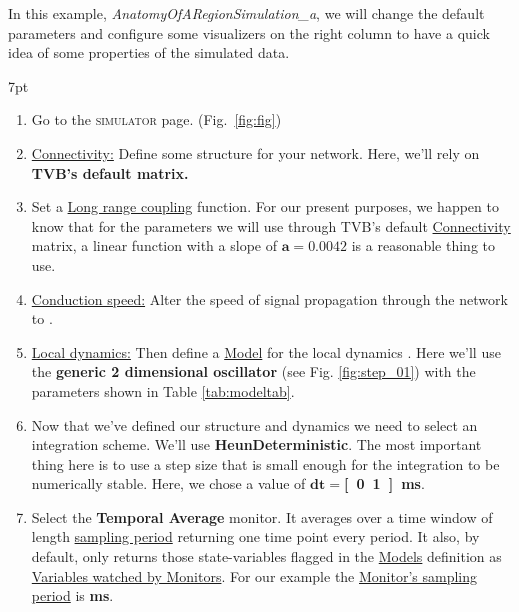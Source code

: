 \documentclass{tufte-handout}
\newenvironment{simulation}{%
  \def\FrameCommand{%
    \hspace{1pt}%
    {\color{ForestGreen}\vrule width 2pt}%
    {\color{simulationshade}\vrule width 4pt}%
    \colorbox{simulationshade}%
  }%
  \MakeFramed{\advance\hsize-\width\FrameRestore}%
  \noindent\hspace{-4.55pt}%
  \begin{adjustwidth}{}{7pt}%
  \vspace{2pt}\vspace{2pt}%
}
{%
  \vspace{2pt}\end{adjustwidth}\endMakeFramed%
}
\begin{document}
In this example, \textit{AnatomyOfARegionSimulation\_a}, we will change the default parameters and configure some
visualizers on the right column to have a quick idea of some properties of the
simulated data.
\begin{simulation}
\begin{enumerate}
\item Go to the \textsc{simulator} page. (Fig.~\ref{fig:fig})

\item \underline{Connectivity:} Define some structure for your network. Here, we'll rely on \textbf{TVB's default  matrix.} 

\item Set a \underline{Long range coupling} function. For our present purposes, we happen to know that for the parameters we will use through TVB's default \underline{Connectivity} matrix, a linear function with a slope of $\mathbf{a=0.0042}$ is a reasonable thing to use. 

\item \underline{Conduction speed:} Alter the speed of signal propagation through the network to \textbf{}. 

\item \underline{Local dynamics:} Then define a \underline{Model} for the local dynamics . Here we'll use the \textbf{generic 2 dimensional oscillator} (see Fig. \ref{fig:step_01}) with the parameters shown in Table \ref{tab:modeltab}.


\item Now that we've defined our structure and dynamics we need to select an integration scheme. We'll use \textbf{HeunDeterministic}. The most important thing here is to use a step size that is small enough for the integration to be numerically stable. Here, we chose a value of $\mathbf{dt=}$\textbf{\unit[0.1]{ms}}.

\item  Select the \textbf{Temporal Average} monitor. It averages over a time window of length \underline{sampling period} returning one time point every period. It also, by default, only returns those state-variables flagged in the \underline{Models} definition as \underline{Variables watched by Monitors}. For our example the \underline{Monitor's sampling period} is \textbf{\unit[1]{ms}}. 
\end{enumerate}
\end{simulation}
\end{document}
